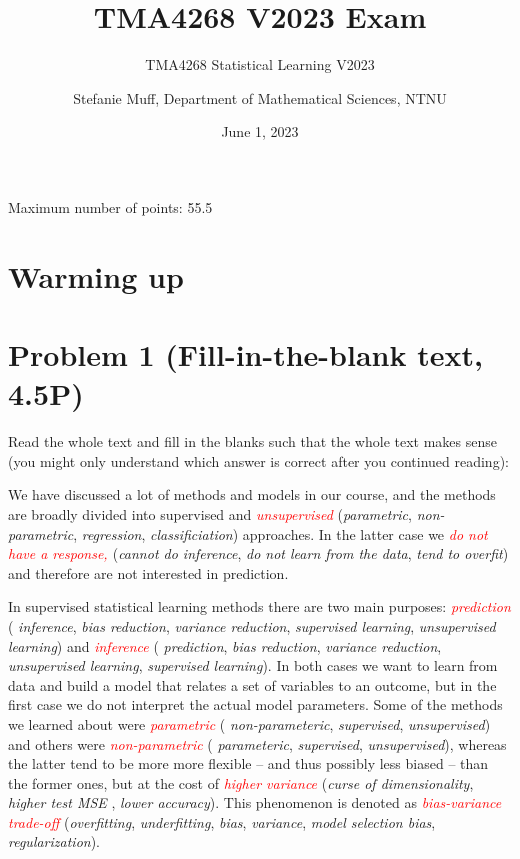 \documentclass[
]{article}
\title{TMA4268 V2023 Exam}
\subtitle{TMA4268 Statistical Learning V2023}
\author{Stefanie Muff, Department of Mathematical Sciences, NTNU}
\date{June 1, 2023}
\begin{document}
\maketitle

Maximum number of points: 55.5

\hypertarget{warming-up}{%
\section{Warming up}\label{warming-up}}

\hypertarget{problem-1-fill-in-the-blank-text-4.5p}{%
\section{Problem 1 (Fill-in-the-blank text,
4.5P)}\label{problem-1-fill-in-the-blank-text-4.5p}}

Read the whole text and fill in the blanks such that the whole text
makes sense (you might only understand which answer is correct after you
continued reading):

We have discussed a lot of methods and models in our course, and the
methods are broadly divided into supervised and
\emph{\textcolor{red}{unsupervised}} (\emph{parametric},
\emph{non-parametric}, \emph{regression}, \emph{classificiation})
approaches. In the latter case we
\emph{\textcolor{red}{do not have a response, }} (\emph{cannot do
inference}, \emph{do not learn from the data}, \emph{tend to overfit})
and therefore are not interested in prediction.

In supervised statistical learning methods there are two main purposes:
\emph{\textcolor{red}{prediction}} ( \emph{inference}, \emph{bias
reduction}, \emph{variance reduction}, \emph{supervised learning},
\emph{unsupervised learning}) and \emph{\textcolor{red}{inference}} (
\emph{prediction}, \emph{bias reduction}, \emph{variance reduction},
\emph{unsupervised learning}, \emph{supervised learning}). In both cases
we want to learn from data and build a model that relates a set of
variables to an outcome, but in the first case we do not interpret the
actual model parameters. Some of the methods we learned about were
\emph{\textcolor{red}{parametric}} ( \emph{non-parameteric},
\emph{supervised}, \emph{unsupervised}) and others were
\emph{\textcolor{red}{non-parametric}} ( \emph{parameteric},
\emph{supervised}, \emph{unsupervised}), whereas the latter tend to be
more more flexible -- and thus possibly less biased -- than the former
ones, but at the cost of \emph{\textcolor{red}{higher variance}}
(\emph{curse of dimensionality}, \emph{higher test MSE} , \emph{lower
accuracy}). This phenomenon is denoted as
\emph{\textcolor{red}{bias-variance trade-off}} (\emph{overfitting},
\emph{underfitting}, \emph{bias}, \emph{variance}, \emph{model selection
bias}, \emph{regularization}).
\end{document}
